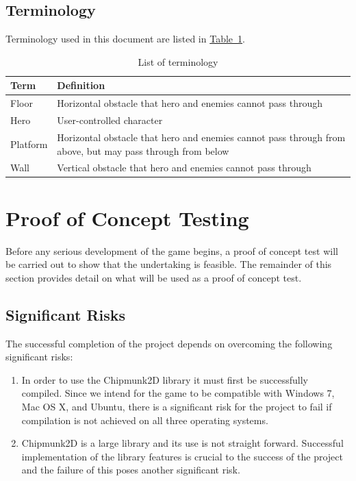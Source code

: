 \documentclass[12pt, titlepage]{article}
\begin{document}
\subsection{Terminology}
Terminology used in this document are listed in \hyperref[tab:terminology]{Table~\ref*{tab:terminology}}.
\begin{table}[ht]
\caption{List of terminology} \label{tab:terminology}
\begin{tabularx}{\textwidth}{p{3cm}X}
\toprule {\bf Term} & {\bf Definition}\\
\midrule
Floor & Horizontal obstacle that hero and enemies cannot pass through\\
Hero & User-controlled character\\
Platform & Horizontal obstacle that hero and enemies cannot pass through from above, but may pass through from below\\
Wall & Vertical obstacle that hero and enemies cannot pass through\\
\bottomrule
\end{tabularx}
\end{table}


\section{Proof of Concept Testing}
\label{sec:poc}
Before any serious development of the game begins, a proof of concept test will be carried out to show that the undertaking is feasible.  The remainder of this section provides detail on what will be used as a proof of concept test.

\subsection{Significant Risks}
The successful completion of the project depends on overcoming the following significant risks:
\begin{enumerate}
  \item In order to use the Chipmunk2D library it must first be successfully compiled.  Since we intend for the game to be compatible with Windows 7, Mac OS X, and Ubuntu, there is a significant risk for the project to fail if compilation is not achieved on all three operating systems.
  \item Chipmunk2D is a large library and its use is not straight forward.  Successful implementation of the library features is crucial to the success of the project and the failure of this poses another significant risk.
\end{enumerate}
\end{document}
